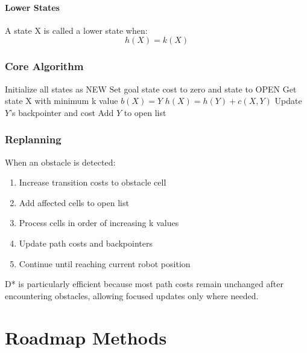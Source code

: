 \documentclass[openany]{book}
\theoremstyle{definition}
\theoremstyle{remark}
\newcommand{\note}[1]{
\begin{tcolorbox}[colback=green!5,colframe=green!40!black,title=Note]
 #1
\end{tcolorbox}
}
\begin{document}
\subsubsection{Lower States}
A state X is called a lower state when:
\begin{equation}
h(X) = k(X)
\end{equation}

\subsection{Core Algorithm}
\begin{algorithmic}[1]
\State Initialize all states as NEW
\State Set goal state cost to zero and state to OPEN
    \State Get state X with minimum k value
                \State $b(X) = Y$
                \State $h(X) = h(Y) + c(X,Y)$
            \EndIf
        \EndFor
    \EndIf
            \State Update $Y$'s backpointer and cost
            \State Add $Y$ to open list
        \EndIf
    \EndFor
\EndWhile
\end{algorithmic}

\subsection{Replanning}
When an obstacle is detected:
\begin{enumerate}
    \item Increase transition costs to obstacle cell
    \item Add affected cells to open list
    \item Process cells in order of increasing k values
    \item Update path costs and backpointers
    \item Continue until reaching current robot position
\end{enumerate}

\note{D* is particularly efficient because most path costs remain unchanged after encountering obstacles, allowing focused updates only where needed.}


\chapter{Roadmap Methods}
\end{document}

